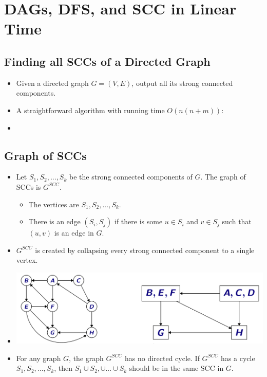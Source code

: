 \documentclass[12pt]{article}
\begin{document}
\section{DAGs, DFS, and SCC in Linear Time}

\subsection{Finding all SCCs of a Directed Graph}
\begin{itemize}
    \item Given a directed graph $G = (V, E)$, output all its strong connected components.
    \item A straightforward algorithm with running time $O(n(n + m))$:
    \item[] 
\end{itemize}

\subsection{Graph of SCCs}
\begin{itemize}
    \item Let $S_1, S_2, ..., S_k$ be the strong connected components of $G$. The graph of SCCs is $G^{SCC}$.
    \begin{itemize}
        \item The vertices are $S_1, S_2, ..., S_k$.
        \item There is an edge $(S_i, S_j)$ if there is some $u \in S_i$ and $v \in S_j$ such that $(u, v)$ is an edge in $G$.
    \end{itemize}
    \item $G^{SCC}$ is created by collapsing every strong connected component to a single vertex.
    \item[] \includegraphics[width=\textwidth]{images/meta-graph.jpg}
    \item For any graph $G$, the graph $G^{SCC}$ has no directed cycle. If $G^{SCC}$ has a cycle $S_1, S_2, ..., S_k$, then $S_1 \cup S_2, \cup ... \cup S_k$ should be in the same SCC in $G$.
\end{itemize}
\end{document}

